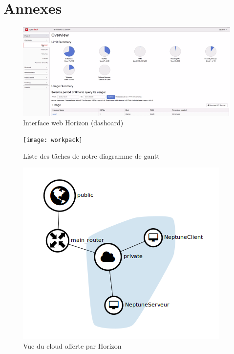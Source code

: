 \documentclass{report}
\begin{document}
 
\newpage

\printbibliography


\newpage
\chapter*{Annexes}
    \begin{figure}[H]
        \centering{}\includegraphics[width=\textwidth]{dash}
        \caption{Interface web Horizon (dashoard)}
        \label{dashboard}
    \end{figure}

    \begin{figure}[H]
        \centering{}\texttt{[image: workpack]}
        \caption{Liste des tâches de notre diagramme de gantt}
        \label{gantt}
    \end{figure}
    
    
    \begin{figure}[H]
        \centering{}\includegraphics[width=\textwidth]{network-topo.png}
        \caption{Vue du cloud offerte par Horizon} 
        \label{cloudHorizon}
    \end{figure}
    
\end{document}
